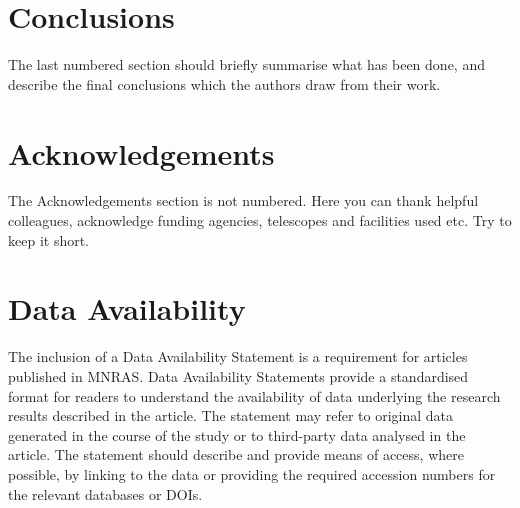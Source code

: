 \documentclass[fleqn,usenatbib]{mnras}
\begin{document}
\section{Conclusions}

The last numbered section should briefly summarise what has been done, and describe
the final conclusions which the authors draw from their work.

\section*{Acknowledgements}

The Acknowledgements section is not numbered. Here you can thank helpful
colleagues, acknowledge funding agencies, telescopes and facilities used etc.
Try to keep it short.

\section*{Data Availability}

 
The inclusion of a Data Availability Statement is a requirement for articles published in MNRAS. Data Availability Statements provide a standardised format for readers to understand the availability of data underlying the research results described in the article. The statement may refer to original data generated in the course of the study or to third-party data analysed in the article. The statement should describe and provide means of access, where possible, by linking to the data or providing the required accession numbers for the relevant databases or DOIs.









\end{document}
